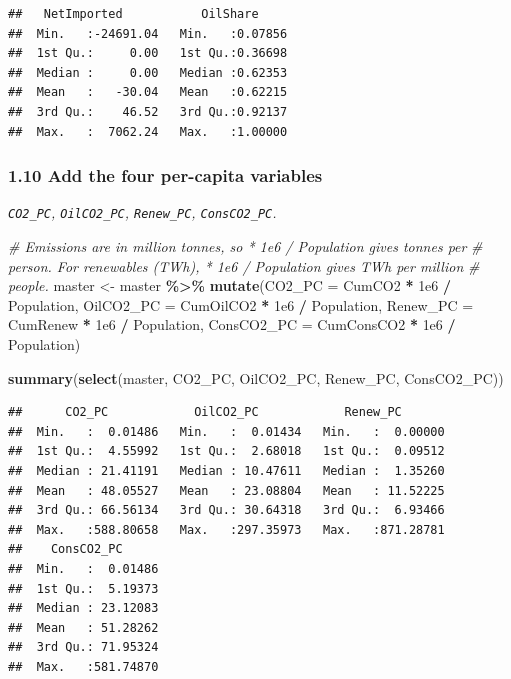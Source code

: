 \documentclass[
]{article}
\newenvironment{Shaded}{\begin{snugshade}}{\end{snugshade}}
\newcommand{\AttributeTok}[1]{\textcolor[rgb]{0.13,0.29,0.53}{#1}}
\newcommand{\CommentTok}[1]{\textcolor[rgb]{0.56,0.35,0.01}{\textit{#1}}}
\newcommand{\FloatTok}[1]{\textcolor[rgb]{0.00,0.00,0.81}{#1}}
\newcommand{\FunctionTok}[1]{\textcolor[rgb]{0.13,0.29,0.53}{\textbf{#1}}}
\newcommand{\NormalTok}[1]{#1}
\newcommand{\OtherTok}[1]{\textcolor[rgb]{0.56,0.35,0.01}{#1}}
\newcommand{\SpecialCharTok}[1]{\textcolor[rgb]{0.81,0.36,0.00}{\textbf{#1}}}
\begin{document}
\begin{verbatim}
##   NetImported           OilShare      
##  Min.   :-24691.04   Min.   :0.07856  
##  1st Qu.:     0.00   1st Qu.:0.36698  
##  Median :     0.00   Median :0.62353  
##  Mean   :   -30.04   Mean   :0.62215  
##  3rd Qu.:    46.52   3rd Qu.:0.92137  
##  Max.   :  7062.24   Max.   :1.00000
\end{verbatim}

\subsubsection{1.10 Add the four per-capita
variables}\label{add-the-four-per-capita-variables}

\emph{\texttt{CO2\_PC}, \texttt{OilCO2\_PC}, \texttt{Renew\_PC},
\texttt{ConsCO2\_PC}.}

\begin{Shaded}
\begin{Highlighting}[]
\CommentTok{\# Emissions are in million tonnes, so * 1e6 / Population gives tonnes per}
\CommentTok{\# person. For renewables (TWh), * 1e6 / Population gives TWh per million}
\CommentTok{\# people.}
\NormalTok{master }\OtherTok{\textless{}{-}}\NormalTok{ master }\SpecialCharTok{\%\textgreater{}\%}
  \FunctionTok{mutate}\NormalTok{(}\AttributeTok{CO2\_PC =}\NormalTok{ CumCO2 }\SpecialCharTok{*} \FloatTok{1e6} \SpecialCharTok{/}\NormalTok{ Population,}
         \AttributeTok{OilCO2\_PC =}\NormalTok{ CumOilCO2 }\SpecialCharTok{*} \FloatTok{1e6} \SpecialCharTok{/}\NormalTok{ Population,}
         \AttributeTok{Renew\_PC =}\NormalTok{ CumRenew }\SpecialCharTok{*} \FloatTok{1e6} \SpecialCharTok{/}\NormalTok{ Population,}
         \AttributeTok{ConsCO2\_PC =}\NormalTok{ CumConsCO2 }\SpecialCharTok{*} \FloatTok{1e6} \SpecialCharTok{/}\NormalTok{ Population)}

\FunctionTok{summary}\NormalTok{(}\FunctionTok{select}\NormalTok{(master, CO2\_PC, OilCO2\_PC, Renew\_PC, ConsCO2\_PC))}
\end{Highlighting}
\end{Shaded}

\begin{verbatim}
##      CO2_PC            OilCO2_PC            Renew_PC        
##  Min.   :  0.01486   Min.   :  0.01434   Min.   :  0.00000  
##  1st Qu.:  4.55992   1st Qu.:  2.68018   1st Qu.:  0.09512  
##  Median : 21.41191   Median : 10.47611   Median :  1.35260  
##  Mean   : 48.05527   Mean   : 23.08804   Mean   : 11.52225  
##  3rd Qu.: 66.56134   3rd Qu.: 30.64318   3rd Qu.:  6.93466  
##  Max.   :588.80658   Max.   :297.35973   Max.   :871.28781  
##    ConsCO2_PC       
##  Min.   :  0.01486  
##  1st Qu.:  5.19373  
##  Median : 23.12083  
##  Mean   : 51.28262  
##  3rd Qu.: 71.95324  
##  Max.   :581.74870
\end{verbatim}
\end{document}
